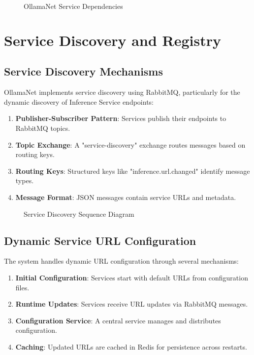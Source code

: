 \begin{figure}
    \centering
    \caption{OllamaNet Service Dependencies}
    \label{fig:service-dependencies}
\end{figure}

\section{Service Discovery and Registry}

\subsection{Service Discovery Mechanisms}

OllamaNet implements service discovery using RabbitMQ, particularly for the dynamic discovery of Inference Service endpoints:

\begin{enumerate}
   \item \textbf{Publisher-Subscriber Pattern}: Services publish their endpoints to RabbitMQ topics.
   \item \textbf{Topic Exchange}: A "service-discovery" exchange routes messages based on routing keys.
   \item \textbf{Routing Keys}: Structured keys like "inference.url.changed" identify message types.
   \item \textbf{Message Format}: JSON messages contain service URLs and metadata.
\end{enumerate}

\begin{figure}
    \centering
    \caption{Service Discovery Sequence Diagram}
    \label{fig:service-discovery}
\end{figure}

\subsection{Dynamic Service URL Configuration}

The system handles dynamic URL configuration through several mechanisms:

\begin{enumerate}
   \item \textbf{Initial Configuration}: Services start with default URLs from configuration files.
   \item \textbf{Runtime Updates}: Services receive URL updates via RabbitMQ messages.
   \item \textbf{Configuration Service}: A central service manages and distributes configuration.
   \item \textbf{Caching}: Updated URLs are cached in Redis for persistence across restarts.
\end{enumerate}

